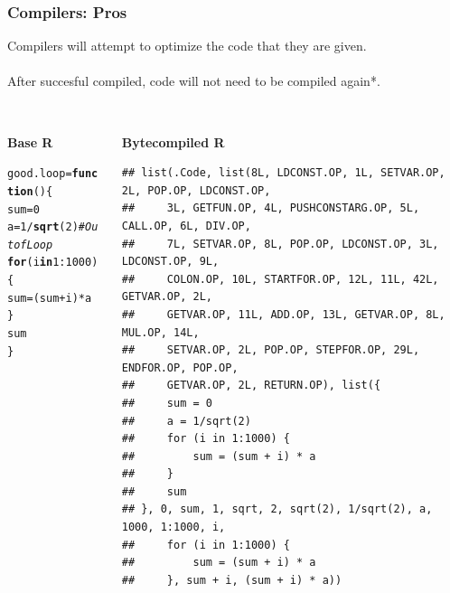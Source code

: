 \documentclass{beamer}\usepackage[]{graphicx}\usepackage[]{color}
\makeatletter
\newcommand{\hlnum}[1]{\textcolor[rgb]{0.686,0.059,0.569}{#1}}%
\newcommand{\hlcom}[1]{\textcolor[rgb]{0.678,0.584,0.686}{\textit{#1}}}%
\newcommand{\hlopt}[1]{\textcolor[rgb]{0,0,0}{#1}}%
\newcommand{\hlstd}[1]{\textcolor[rgb]{0.345,0.345,0.345}{#1}}%
\newcommand{\hlkwa}[1]{\textcolor[rgb]{0.161,0.373,0.58}{\textbf{#1}}}%
\newcommand{\hlkwb}[1]{\textcolor[rgb]{0.69,0.353,0.396}{#1}}%
\newcommand{\hlkwd}[1]{\textcolor[rgb]{0.737,0.353,0.396}{\textbf{#1}}}%
\newenvironment{kframe}{%
 \def\at@end@of@kframe{}%
 \ifinner\ifhmode%
  \def\at@end@of@kframe{\end{minipage}}%
  \begin{minipage}{\columnwidth}%
 \fi\fi%
 \def\FrameCommand##1{\hskip\@totalleftmargin \hskip-\fboxsep
 \colorbox{shadecolor}{##1}\hskip-\fboxsep
     \hskip-\linewidth \hskip-\@totalleftmargin \hskip\columnwidth}%
 \MakeFramed {\advance\hsize-\width
   \@totalleftmargin\z@ \linewidth\hsize
   \@setminipage}}%
 {\par\unskip\endMakeFramed%
 \at@end@of@kframe}
\newenvironment{knitrout}{}{} %
\makeatother
\begin{document}
\begin{frame}[fragile]
\frametitle{Compilers: Pros}
Compilers will attempt to optimize the code that they are given.\\$ $\\
After succesful compiled, code will not need to be compiled again*.\\$ $\\

  \begin{columns}
    \begin{column}{.4\linewidth}
    {\textbf{Base R}}
\begin{knitrout}\tiny
{}\color{fgcolor}\begin{kframe}
\begin{alltt}
\hlstd{good.loop} \hlkwb{=} \hlkwa{function}\hlstd{()\{}
  \hlstd{sum} \hlkwb{=} \hlnum{0}
  \hlstd{a} \hlkwb{=} \hlnum{1}\hlopt{/}\hlkwd{sqrt}\hlstd{(}\hlnum{2}\hlstd{)} \hlcom{# Out of Loop}
  \hlkwa{for}\hlstd{(i} \hlkwa{in} \hlnum{1}\hlopt{:}\hlnum{1000}\hlstd{)\{}
    \hlstd{sum} \hlkwb{=} \hlstd{(sum}\hlopt{+}\hlstd{i)}\hlopt{*}\hlstd{a}
  \hlstd{\}}
  \hlstd{sum}
\hlstd{\}}
\end{alltt}
\end{kframe}
\end{knitrout}
    \end{column}
    \begin{column}{.6\linewidth}
     {\textbf{Bytecompiled R}}
\begin{knitrout}\tiny
{}\color{fgcolor}\begin{kframe}
\begin{verbatim}
## list(.Code, list(8L, LDCONST.OP, 1L, SETVAR.OP, 2L, POP.OP, LDCONST.OP, 
##     3L, GETFUN.OP, 4L, PUSHCONSTARG.OP, 5L, CALL.OP, 6L, DIV.OP, 
##     7L, SETVAR.OP, 8L, POP.OP, LDCONST.OP, 3L, LDCONST.OP, 9L, 
##     COLON.OP, 10L, STARTFOR.OP, 12L, 11L, 42L, GETVAR.OP, 2L, 
##     GETVAR.OP, 11L, ADD.OP, 13L, GETVAR.OP, 8L, MUL.OP, 14L, 
##     SETVAR.OP, 2L, POP.OP, STEPFOR.OP, 29L, ENDFOR.OP, POP.OP, 
##     GETVAR.OP, 2L, RETURN.OP), list({
##     sum = 0
##     a = 1/sqrt(2)
##     for (i in 1:1000) {
##         sum = (sum + i) * a
##     }
##     sum
## }, 0, sum, 1, sqrt, 2, sqrt(2), 1/sqrt(2), a, 1000, 1:1000, i, 
##     for (i in 1:1000) {
##         sum = (sum + i) * a
##     }, sum + i, (sum + i) * a))
\end{verbatim}
\end{kframe}
\end{knitrout}
    \end{column}
  \end{columns}
\end{frame}
\end{document}
